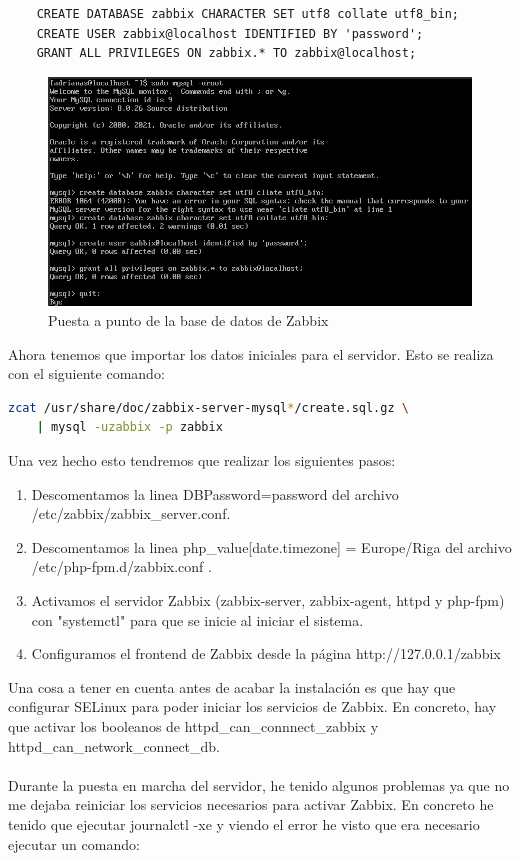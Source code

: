 \begin{lstlisting}
	CREATE DATABASE zabbix CHARACTER SET utf8 collate utf8_bin;
	CREATE USER zabbix@localhost IDENTIFIED BY 'password';
	GRANT ALL PRIVILEGES ON zabbix.* TO zabbix@localhost;
\end{lstlisting}

\begin{figure}[H]
	\centering
	\includegraphics[scale=0.5]{graphics/img4}
	\caption{Puesta a punto de la base de datos de Zabbix}
\end{figure}
Ahora tenemos que importar los datos iniciales para el servidor. Esto se realiza con el siguiente comando:
\begin{lstlisting}[language=bash]
	zcat /usr/share/doc/zabbix-server-mysql*/create.sql.gz \
	| mysql -uzabbix -p zabbix
\end{lstlisting}

Una vez hecho esto tendremos que realizar los siguientes pasos:

\begin{enumerate}
	\item Descomentamos la linea DBPassword=password del archivo /etc/zabbix/zabbix\_server.conf.

	\item Descomentamos la linea php\_value[date.timezone] = Europe/Riga del archivo /etc/php-fpm.d/zabbix.conf .

	\item Activamos el servidor Zabbix (zabbix-server, zabbix-agent, httpd y php-fpm) con "systemctl" para que se inicie al iniciar el sistema.
	\item Configuramos el frontend de Zabbix desde la página http://127.0.0.1/zabbix
\end{enumerate}

Una cosa a tener en cuenta antes de acabar la instalación es que hay que configurar SELinux para poder iniciar los servicios de Zabbix. En concreto, hay que activar los booleanos de httpd\_can\_connnect\_zabbix y httpd\_can\_network\_connect\_db.
\\\\
Durante la puesta en marcha del servidor, he tenido algunos problemas ya que no me dejaba reiniciar los servicios necesarios para activar Zabbix. En concreto he tenido que ejecutar journalctl -xe y viendo el error he visto que era necesario ejecutar un comando:

